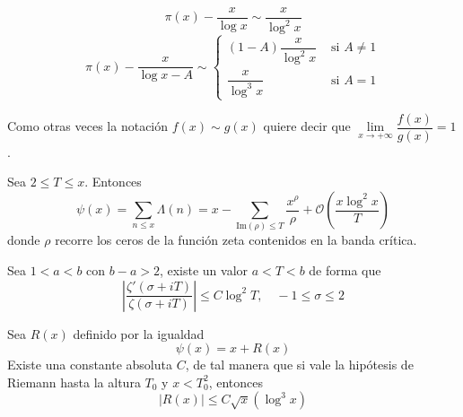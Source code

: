 \documentclass[TAN.tex]{subfiles}
\begin{document}
\begin{coro}
\[ π(x) - \frac{x}{\log x} \sim \frac{x}{\log^2 x} \]
\[ π(x) - \frac{x}{\log x - A} \sim \begin{cases}
	(1-A)\dfrac{x}{\log^2 x} &\text{ si }A \neq 1\\
	\dfrac{x}{\log^3 x} &\text{ si }A=1
\end{cases}\]
\end{coro}

Como otras veces la notación $f(x) \sim g(x)$ quiere decir que $\lim\limits_{x \to +∞} \dfrac{f(x)}{g(x)} = 1$.

\begin{teorema}
Sea $2 ≤ T ≤ x$. Entonces
\[ ψ(x) = \sum_{n≤x} Λ(n) = x - \sum_{\text{Im}(ρ)≤T} \frac{x^ρ}{ρ} + \mathcal{O}\left(\frac{x\log^2 x}{T}\right) \]
donde $ρ$ recorre los ceros de la función zeta contenidos en la banda crítica.
\end{teorema}

\begin{lemma}
Sea $1<a<b$ con $b-a>2$, existe un valor $a<T<b$ de forma que
\[ \left|\frac{ζ'(σ+iT)}{ζ(σ+iT)}\right| ≤ C \log^2 T, \quad -1≤σ≤2 \]
\end{lemma}

\begin{teorema}
Sea $R(x)$ definido por la igualdad
\[ ψ(x) = x + R(x) \]
Existe una constante absoluta $C$, de tal manera que si vale la hipótesis de Riemann hasta la altura $T_0$ y $x < T_0^2$, entonces
\[ |R(x)| ≤ C \sqrt{x} (\log^3 x) \]
\end{teorema}
\end{document}
